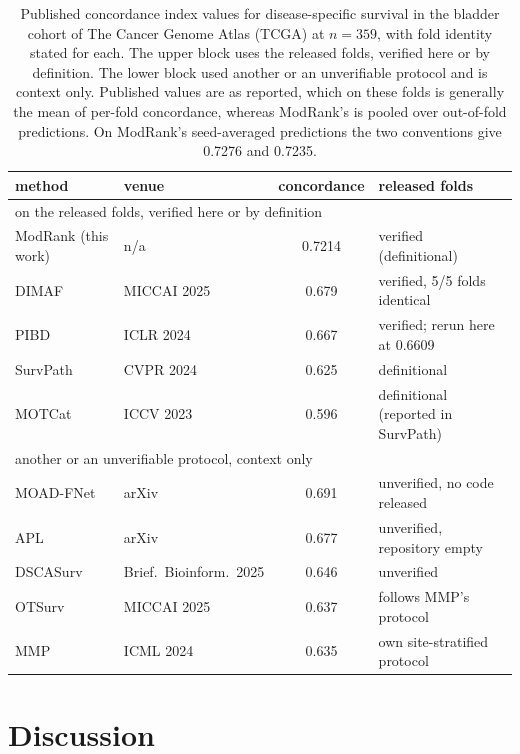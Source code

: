 \documentclass[pdflatex,sn-nature]{sn-jnl}
\begin{document}
\begin{table}[p]
\centering
\caption{Published concordance index values for disease-specific survival in the bladder cohort of
The Cancer Genome Atlas (TCGA) at $n=359$, with fold identity stated for each. The upper block uses
the released folds, verified here or by definition. The lower block used another or an unverifiable
protocol and is context only. Published values are as reported, which on these folds is generally
the mean of per-fold concordance, whereas ModRank's is pooled over out-of-fold predictions. On
ModRank's seed-averaged predictions the two conventions give 0.7276 and 0.7235.}
\label{tab:published}
\small
\begin{tabular}{llcl}
\toprule
method & venue & concordance & released folds \\
\midrule
\multicolumn{4}{l}{on the released folds, verified here or by definition} \\
ModRank (this work) & n/a & 0.7214 & verified (definitional) \\
DIMAF~\citep{eijpe2025dimaf} & MICCAI 2025 & 0.679 & verified, 5/5 folds identical \\
PIBD~\citep{zhang2024pibd} & ICLR 2024 & 0.667 & verified; rerun here at 0.6609 \\
SurvPath~\citep{jaume2024survpath} & CVPR 2024 & 0.625 & definitional \\
MOTCat~\citep{xu2023motcat} & ICCV 2023 & 0.596 & definitional (reported in SurvPath) \\
\midrule
\multicolumn{4}{l}{another or an unverifiable protocol, context only} \\
MOAD-FNet~\citep{moadfnet2024} & arXiv & 0.691 & unverified, no code released \\
APL~\citep{apl2025} & arXiv & 0.677 & unverified, repository empty \\
DSCASurv~\citep{song2025dscasurv} & Brief.\ Bioinform.\ 2025 & 0.646 & unverified \\
OTSurv~\citep{ren2025otsurv} & MICCAI 2025 & 0.637 & follows MMP's protocol \\
MMP~\citep{song2024mmp} & ICML 2024 & 0.635 & own site-stratified protocol \\
\bottomrule
\end{tabular}
\end{table}

\section*{Discussion}
\end{document}
